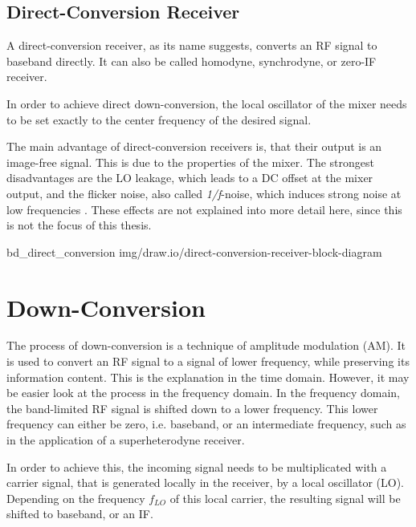\subsection{Direct-Conversion Receiver}

A direct-conversion receiver, as its name suggests, converts an RF signal to baseband directly.
It can also be called homodyne, synchrodyne, or zero-IF receiver.

In order to achieve direct down-conversion, the local oscillator of the mixer needs to be set exactly to the center frequency of the desired signal.

The main advantage of direct-conversion receivers is, that their output is an image-free signal.
This is due to the properties of the mixer.
The strongest disadvantages are the LO leakage, which leads to a DC offset at the mixer output, and the flicker noise, also called \textit{1/f}-noise, which induces strong noise at low frequencies \cite{PassosFábio2020AHSo}.
These effects are not explained into more detail here, since this is not the focus of this thesis.

 {bd_direct_conversion} {img/draw.io/direct-conversion-receiver-block-diagram}


\section{Down-Conversion}

The process of down-conversion is a technique of amplitude modulation (AM).
It is used to convert an RF signal to a signal of lower frequency, while preserving its information content.
This is the explanation in the time domain.
However, it may be easier look at the process in the frequency domain.
In the frequency domain, the band-limited RF signal is shifted down to a lower frequency.
This lower frequency can either be zero, i.e. baseband, or an intermediate frequency, such as in the application of a superheterodyne receiver.

In order to achieve this, the incoming signal needs to be multiplicated with a carrier signal, that is generated locally in the receiver, by a local oscillator (LO).
Depending on the frequency $f_{LO}$ of this local carrier, the resulting signal will be shifted to baseband, or an IF.


